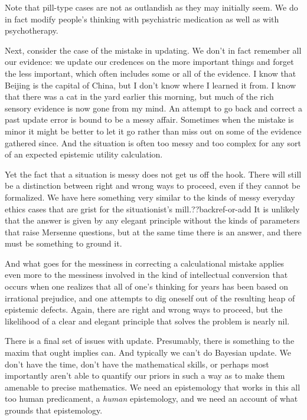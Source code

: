 Note that pill-type cases are not as outlandish as they may initially seem. We do in fact modify people's thinking with
psychiatric medication as well as with psychotherapy.

Next, consider the case of the mistake in updating. We don't in fact remember all our evidence:
we update our credences on the more important things and forget the less important, which often includes some or
all of the evidence. I know that Beijing is the capital of China, but I don't know where I learned it from. I know that 
there was a cat in the yard earlier this morning, but much of the rich sensory evidence is now gone from my mind. 
An attempt to go back and correct a past update error is bound to be a messy affair. Sometimes when the mistake is minor
it might be better to let it go rather than miss out on some of the evidence gathered since. And the situation is often
too messy and too complex for any sort of an expected epistemic utility calculation. 

Yet the fact that a situation is messy does not get us off the hook. There will still
be a distinction between right and wrong ways to proceed, even if they cannot be formalized. We have here something very
similar to the kinds of messy everyday ethics cases that are grist for the situationist's mill.??backref-or-add 
It is unlikely that the answer is given by any elegant principle without the kinds of parameters that raise Mersenne
questions, but at the same time there is an answer, and there
must be something to ground it.

And what goes for the messiness in correcting a calculational mistake applies even more to the messiness involved in
the kind of intellectual conversion that occurs when one realizes that all of one's thinking for years has been based
on irrational prejudice, and one attempts to dig oneself out of the resulting heap of epistemic defects. Again, there
are right and wrong ways to proceed, but the likelihood of a clear and elegant principle that solves the problem is
nearly nil. 

There is a final set of issues with update. Presumably, there is something to the maxim that ought implies can. And typically 
we can't do Bayesian update. We don't have the time, don't have the mathematical skills, or perhaps most importantly aren't 
able to quantify our priors in such a way as to make them amenable to precise mathematics. We need an epistemology that 
works in this all too human predicament, a \textit{human} epistemology, and we need an account of what grounds that 
epistemology. 

